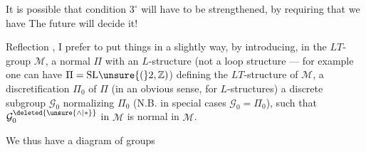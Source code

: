 
It is possible that condition \(3^\circ\) will have to be strengthened, by requiring that we have
The future will decide it!


Reflection , I prefer to put things in a slightly  way, by introducing, in the  \(LT\)-group \(\mathcal{M}\), a normal   \(\Pi\) with an \(L\)-structure (not  a loop structure --- for example one can have \(\Pi=\mathrm{SL}\unsure{(}2,\mathbb{Z})\)) defining the \(LT\)-structure of \(\mathcal{M}\), a discretification \(\Pi_0\) of \(\Pi\) (in an obvious sense, for \(L\)-structures) a discrete subgroup \(\mathcal{G}_0\)  normalizing \(\Pi_0\) (N.B. in  special cases  \(\mathcal{G}_0=\Pi_0\)), such that  \(\mathcal{G}_0^{\deleted{\unsure{\wedge|*}}}\)  in \(\mathcal{M}\) is normal in \(\mathcal{M}\).

We thus have a diagram of groups

